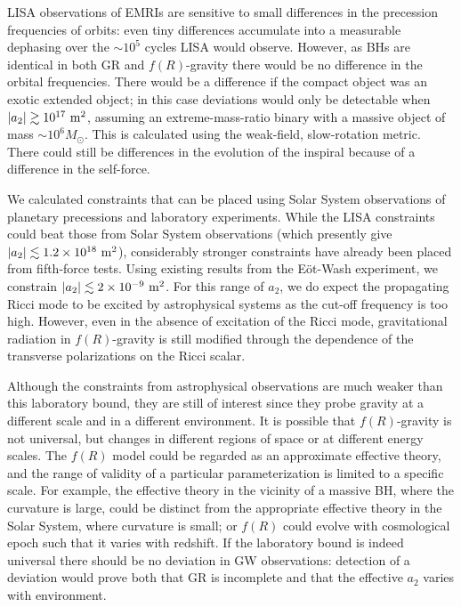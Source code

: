 LISA observations of EMRIs are sensitive to small differences in the precession frequencies of orbits: even tiny differences accumulate into a measurable dephasing over the $\sim 10^5$ cycles LISA would observe. However, as BHs are identical in both GR and $f(R)$-gravity there would be no difference in the orbital frequencies. There would be a difference if the compact object was an exotic extended object; in this case deviations would only be detectable when $|a_2| \gtrsim 10^{17}~\mathrm{m^2}$, assuming an extreme-mass-ratio binary with a massive object of mass $\sim 10^6 M_\odot$. This is calculated using the weak-field, slow-rotation metric. There could still be differences in the evolution of the inspiral because of a difference in the self-force.

We calculated constraints that can be placed using Solar System observations of planetary precessions and laboratory experiments. While the LISA constraints could beat those from Solar System observations (which presently give $|a_2| \lesssim 1.2 \times 10^{18}~\mathrm{m^2}$), considerably stronger constraints have already been placed from fifth-force tests. Using existing results from the E\"ot-Wash experiment, we constrain $|a_2| \lesssim 2 \times 10^{-9}~\mathrm{m^2}$. For this range of $a_2$, we do expect the propagating Ricci mode to be excited by astrophysical systems as the cut-off frequency is too high. However, even in the absence of excitation of the Ricci mode, gravitational radiation in $f(R)$-gravity is still modified through the dependence of the transverse polarizations on the Ricci scalar. 

Although the constraints from astrophysical observations are much weaker than this laboratory bound, they are still of interest since they probe gravity at a different scale and in a different environment. It is possible that $f(R)$-gravity is not universal, but changes in different regions of space or at different energy scales. The $f(R)$ model could be regarded as an approximate effective theory, and the range of validity of a particular parameterization is limited to a specific scale. For example, the effective theory in the vicinity of a massive BH, where the curvature is large, could be distinct from the appropriate effective theory in the Solar System, where curvature is small; or $f(R)$ could evolve with cosmological epoch such that it varies with redshift. If the laboratory bound is indeed universal there should be no deviation in GW observations: detection of a deviation would prove both that GR is incomplete and that the effective $a_2$ varies with environment.

